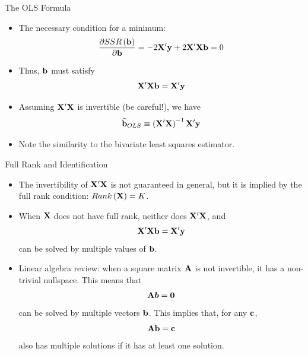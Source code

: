 \documentclass[english,xcolor={dvipsnames},aspectratio=169]{beamer}
\begin{document}
\begin{frame}{The OLS Formula}
\begin{itemize}
	\item The necessary condition for a minimum:\[
	\frac{\partial SSR\left({\bf b}\right)}{\partial {\bf b}} = - 2 {\bf X}' {\bf y} + 2 {\bf X}'{\bf X} {\bf b} = 0 
	\]

	\item Thus, ${\bf b}$ must satisfy\[
	{\bf X}'{\bf X} {\bf b} =  {\bf X}' {\bf y} 
	\]


	\item Assuming ${\bf X}'{\bf X}$ is invertible (be careful!), we have\[
	\widehat{{\bf b}}_{OLS} \equiv  \left({\bf X}'{\bf X}\right)^{-1} {\bf X}' {\bf y} 
	\]

	\item Note the similarity to the bivariate least squares estimator. 

\end{itemize}
\end{frame}


\begin{frame}{Full Rank and Identification}
\begin{itemize}
	\item The invertibility of ${\bf X}'{\bf X}$ is not guaranteed in general, but
	it is implied by the full rank condition: $Rank\left({\bf X}\right) = K$.

	\item When ${\bf X}$ does not have full rank, neither does ${\bf X}'{\bf X}$, and \[
	{\bf X}'{\bf X} {\bf b} =  {\bf X}' {\bf y} 
	\]
	can be solved by multiple values of ${\bf b}$. 

	\item Linear algebra review: when a square matrix ${\bf A}$ is not invertible, 
	it has a non-trivial nullspace. This means that \[
	{\bf A} \boldsymbol{b} =  {\bf 0}
	\]
	can be solved by multiple vectors ${\bf b}$. This implies that, for any ${\bf c} $,
	\[
	{\bf A} {\bf b} =  {\bf c} 
	\]
	also has multiple solutions if it has at least one solution. 
	

\end{itemize}
\end{frame}
\end{document}
